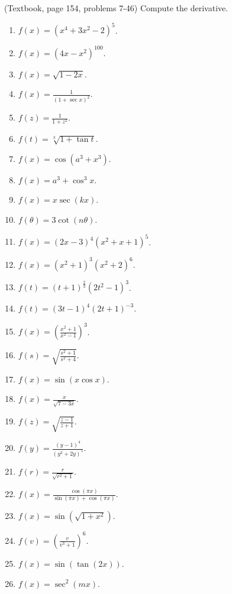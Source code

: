 \begin{problem}(Textbook, page 154, problems 7-46) Compute the derivative.
\begin{multicols}{3}
\begin{enumerate}
\item $\displaystyle f(x)= (x^4+3x^2-2)^5$.
\item $\displaystyle f(x)= (4x-x^2)^{100}$.
\item $\displaystyle f(x)= \sqrt{1-2x}$.
\item $\displaystyle f(x)= \frac{1}{(1+\sec x)^2}$.
\item $\displaystyle f(z)=\frac{1}{1+z^2} $.
\item $\displaystyle f(t)= \sqrt[3]{1+\tan t}$.
\item $\displaystyle f(x)=\cos (a^3+x^3) $.
\item $\displaystyle f(x)= a^3+\cos^3 x$.
\item $\displaystyle f(x)= x\sec (kx) $.
\item $\displaystyle f(\theta)= 3\cot (n\theta)$.
\item $\displaystyle f(x)= (2x - 3)^4 (x^2 + x + 1)^5$.
\item $\displaystyle f(x)= (x^2+1)^3(x^2+2)^6$.
\item $\displaystyle f(t)= (t+1)^{\frac{2}{3}}(2t^2-1)^3$.
\item $\displaystyle f(t)= (3t-1)^4(2t+1)^{-3}$.
\item $\displaystyle f(x)=\left(\frac{x^2+1}{x^2-1} \right)^3 $.
\item $\displaystyle f(s)= \sqrt{\frac{s^2+1}{s^2+4}}$.
\item $\displaystyle f(x)=\sin (x\cos x) $.
\item $\displaystyle f(x)=\frac{x}{\sqrt{7-3x}} $.
\item $\displaystyle f(z)=\sqrt{\frac{z-1}{z+1}} $.
\item $\displaystyle f(y)= \frac{(y-1)^4 }{(y^2+2y)^5}$.
\item $\displaystyle f(r)=\frac{r}{\sqrt{r^2+1}} $.
\item $\displaystyle f(x)=\frac{\cos (\pi x)}{\sin (\pi x)+\cos (\pi x) } $.
\item $\displaystyle f(x)=\sin (\sqrt{1+x^2}) $.
\item $\displaystyle f(v)=\left(\frac{v}{v^3+1}\right)^6 $.
\item $\displaystyle f(x)=\sin (\tan (2x)) $.
\item $\displaystyle f(x)=\sec^2(m x) $.

\end{enumerate}
\end{multicols}
\end{problem}
